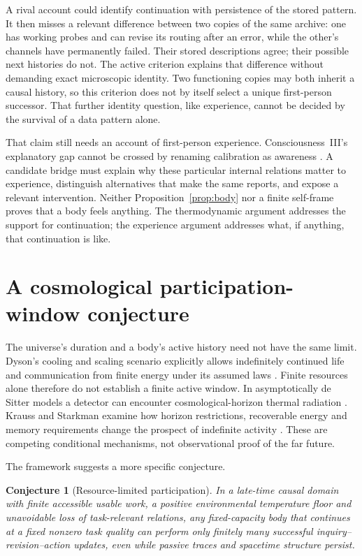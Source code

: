 \documentclass[12pt,a4paper]{article}
\newtheorem{conjecture}{Conjecture}
\begin{document}
A rival account could identify continuation with persistence of the stored pattern. It then misses a relevant difference between two copies of the same archive: one has working probes and can revise its routing after an error, while the other's channels have permanently failed. Their stored descriptions agree; their possible next histories do not. The active criterion explains that difference without demanding exact microscopic identity. Two functioning copies may both inherit a causal history, so this criterion does not by itself select a unique first-person successor. That further identity question, like experience, cannot be decided by the survival of a data pattern alone.

That claim still needs an account of first-person experience. Consciousness~III's explanatory gap cannot be crossed by renaming calibration as awareness \cite{Consciousness}. A candidate bridge must explain why these particular internal relations matter to experience, distinguish alternatives that make the same reports, and expose a relevant intervention. Neither Proposition~\ref{prop:body} nor a finite self-frame proves that a body feels anything. The thermodynamic argument addresses the support for continuation; the experience argument addresses what, if anything, that continuation is like.

\section{A cosmological participation-window conjecture}

The universe's duration and a body's active history need not have the same limit. Dyson's cooling and scaling scenario explicitly allows indefinitely continued life and communication from finite energy under its assumed laws \cite{Dyson}. Finite resources alone therefore do not establish a finite active window. In asymptotically de Sitter models a detector can encounter cosmological-horizon thermal radiation \cite{GH}. Krauss and Starkman examine how horizon restrictions, recoverable energy and memory requirements change the prospect of indefinite activity \cite{KS}. These are competing conditional mechanisms, not observational proof of the far future.

The framework suggests a more specific conjecture.

\begin{conjecture}[Resource-limited participation]
In a late-time causal domain with finite accessible usable work, a positive environmental temperature floor and unavoidable loss of task-relevant relations, any fixed-capacity body that continues at a fixed nonzero task quality can perform only finitely many successful inquiry--revision--action updates, even while passive traces and spacetime structure persist.
\end{conjecture}
\end{document}
